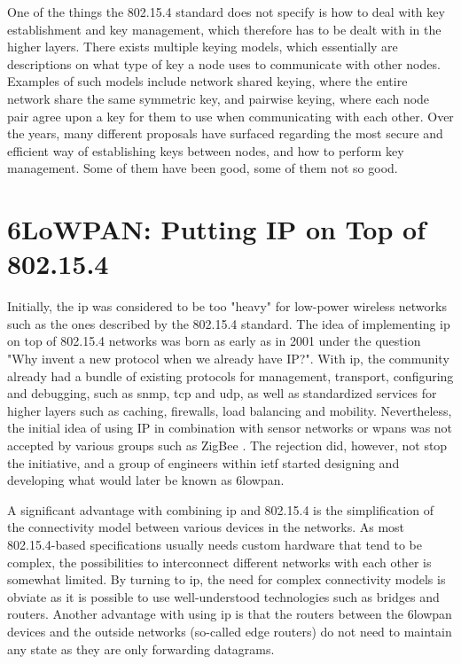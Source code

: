 
One of the things the 802.15.4 standard does not specify is how to deal with key establishment and key management, which therefore has to be dealt with in the higher layers. There exists multiple keying models, which essentially are descriptions on what type of key a node uses to communicate with other nodes. Examples of such models include network shared keying, where the entire network share the same symmetric key, and pairwise keying, where each node pair agree upon a key for them to use when communicating with each other. Over the years, many different proposals have surfaced regarding the most secure and efficient way of establishing keys between nodes, and how to perform key management. Some of them have been good, some of them not so good.


\section{6LoWPAN: Putting IP on Top of 802.15.4}


Initially, the \gls{ip} was considered to be too "heavy" for low-power wireless networks such as the ones described by the 802.15.4 standard. The idea of implementing \gls{ip} on top of 802.15.4 networks was born as early as in 2001 under the question "Why invent a new protocol when we already have IP?"\cite{Mulligan2007}. With \gls{ip}, the community already had a bundle of existing protocols for management, transport, configuring and debugging, such as \gls{snmp}, \gls{tcp} and \gls{udp}, as well as standardized services for higher layers such as caching, firewalls, load balancing and mobility. Nevertheless, the initial idea of using IP in combination with sensor networks or \gls{wpan}s was not accepted by various groups such as ZigBee \cite{Mulligan2007}. The rejection did, however, not stop the initiative, and a group of engineers within \gls{ietf} started designing and developing what would later be known as \gls{6lowpan}.

A significant advantage with combining \gls{ip} and 802.15.4 is the simplification of the connectivity model between various devices in the networks. As most 802.15.4-based specifications usually needs custom hardware that tend to be complex, the possibilities to interconnect different networks with each other is somewhat limited. By turning to \gls{ip}, the need for complex connectivity models is obviate as it is possible to use well-understood technologies such as bridges and routers. Another advantage with using \gls{ip} is that the routers between the \gls{6lowpan} devices and the outside networks (so-called edge routers) do not need to maintain any state as they are only forwarding datagrams.

